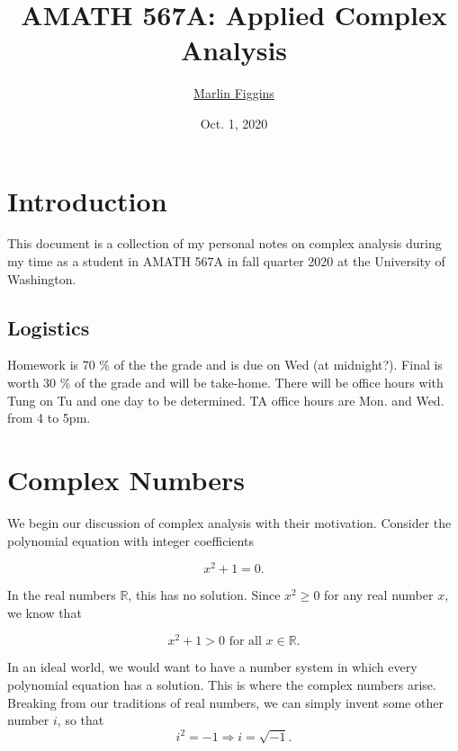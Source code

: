 \documentclass[12pt]{article}
\title{\bfseries\huge{AMATH 567A: Applied Complex Analysis}\vspace{-1ex}} \author{\href{marlinfiggins@gmail.com}{\Large{Marlin Figgins}}\vspace{-2ex}}
\date{\large{Oct. 1, 2020}}
\newcommand{\bbR}{\mathbb{R}}
\theoremstyle{definition}
\theoremstyle{remark}
\numberwithin{equation}{section}
\begin{document}
\maketitle

	\section*{\hfill Introduction \hfill}

  This document is a collection of my personal notes on complex analysis during my time as a student in AMATH 567A in fall quarter 2020 at the University of Washington.

  \subsection*{Logistics}%
  \label{sub:logistics}
  
  Homework is 70 \% of the the grade and is due on Wed (at midnight?). Final is worth 30 \% of the grade and will be take-home. There will be office hours with Tung on Tu and one day to be determined. TA office hours are Mon. and Wed. from 4 to 5pm.  

  \thispagestyle{empty}

  \newpage
  \tableofcontents
  \thispagestyle{empty}
  \newpage

  \setcounter{page}{1}



  \section{Complex Numbers}
  \label{sec:complex_numbers}

We begin our discussion of complex analysis with their motivation. Consider the polynomial equation with integer coefficients

\begin{equation}
  x^2 + 1 = 0. %
\end{equation}

In the real numbers $\bbR$, this has no solution. Since $x^2 \geq 0$ for any real number $x$, we know that

\begin{equation*}
x^2 + 1 > 0 \text{ for all } x\in \bbR.
\end{equation*}

In an ideal world, we would want to have a number system in which every polynomial equation has a solution. This is where the complex numbers arise. Breaking from our traditions of real numbers, we can simply invent some other number $i$, so that
\begin{equation*}
  i^2 = -1 \Rightarrow i = \sqrt{-1}.
\end{equation*}
\end{document}
